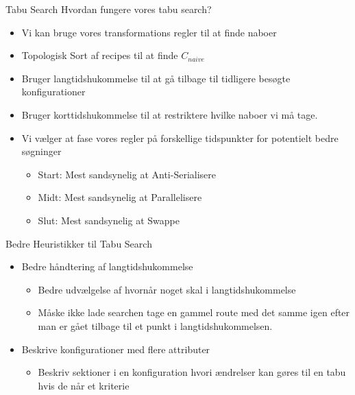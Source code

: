 \begin{frame} {Tabu Search}
	Hvordan fungere vores tabu search?
	\begin{itemize}
		\item Vi kan bruge vores transformations regler til at finde naboer
		\item Topologisk Sort af recipes til at finde $C_{naive}$
		\item Bruger langtidshukommelse til at gå tilbage til tidligere besøgte konfigurationer
		\item Bruger korttidshukommelse til at restriktere hvilke naboer vi må tage.
		\item Vi vælger at fase vores regler på forskellige tidspunkter for potentielt bedre søgninger
		\begin{itemize}
			\item Start: Mest sandsynelig at Anti-Serialisere
			\item Midt: Mest sandsynelig at Parallelisere
			\item Slut: Mest sandsynelig at Swappe
		\end{itemize}
	\end{itemize}
\end{frame}

\begin{frame}{Bedre Heuristikker til Tabu Search}
	\begin{itemize}
		\item Bedre håndtering af langtidshukommelse
		\begin{itemize}
			\item Bedre udvælgelse af hvornår noget skal i langtidshukommelse
			\item Måske ikke lade searchen tage en gammel route med det samme igen efter man er gået tilbage til et punkt i langtidshukommelsen.
		\end{itemize}
		\item Beskrive konfigurationer med flere attributer
		\begin{itemize}
			\item Beskriv sektioner i en konfiguration hvori ændrelser kan gøres til en tabu hvis de når et kriterie
		\end{itemize}
	\end{itemize}
\end{frame}


